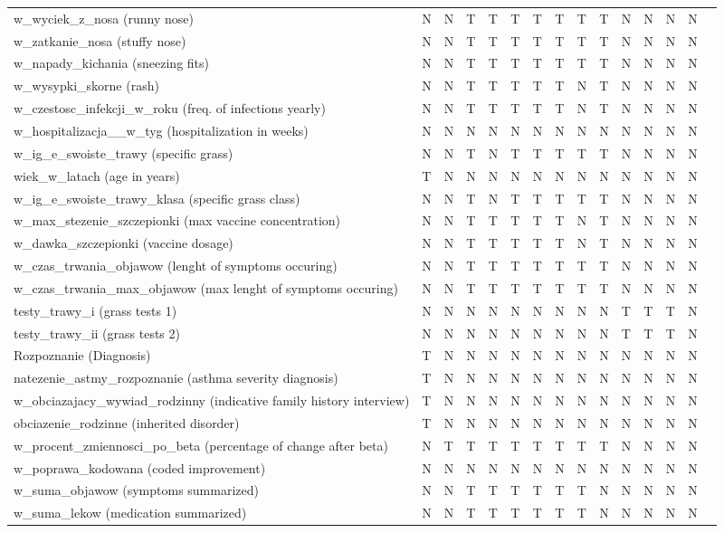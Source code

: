 \documentclass[10pt,oneside]{memoir}
\begin{document}
\begin{table}[htbp]
\begin{minipage}{\linewidth}
\begin{tabulary}{\linewidth}{@{}l@{}l@{}l@{}l@{}l@{}l@{}l@{}l@{}l@{}l@{}l@{}l@{}l@{}l@{}l@{}}
w\_wyciek\_z\_nosa (runny nose)&N&N&T&T&T&T&T&T&T&N&N&N&N \\
w\_zatkanie\_nosa (stuffy nose)&N&N&T&T&T&T&T&T&T&N&N&N&N \\
w\_napady\_kichania (sneezing fits)&N&N&T&T&T&T&T&T&T&N&N&N&N \\
w\_wysypki\_skorne (rash)&N&N&T&T&T&T&T&N&T&N&N&N&N \\
w\_czestosc\_infekcji\_w\_roku (freq. of infections yearly)&N&N&T&T&T&T&T&N&T&N&N&N&N \\
w\_hospitalizacja\_\_w\_tyg (hospitalization in weeks)&N&N&N&N&N&N&N&N&N&N&N&N&N \\
w\_ig\_e\_swoiste\_trawy (specific grass)&N&N&T&N&T&T&T&T&T&N&N&N&N \\
wiek\_w\_latach (age in years)&T&N&N&N&N&N&N&N&N&N&N&N&N \\
w\_ig\_e\_swoiste\_trawy\_klasa (specific grass class)&N&N&T&N&T&T&T&T&T&N&N&N&N \\
w\_max\_stezenie\_szczepionki (max vaccine concentration)&N&N&T&T&T&T&T&N&T&N&N&N&N \\
w\_dawka\_szczepionki (vaccine dosage)&N&N&T&T&T&T&T&N&T&N&N&N&N \\
w\_czas\_trwania\_objawow (lenght of symptoms occuring)&N&N&T&T&T&T&T&T&T&N&N&N&N \\
w\_czas\_trwania\_max\_objawow (max lenght of symptoms occuring)&N&N&T&T&T&T&T&T&T&N&N&N&N \\
testy\_trawy\_i (grass tests 1)&N&N&N&N&N&N&N&N&N&T&T&T&N \\
testy\_trawy\_ii (grass tests 2)&N&N&N&N&N&N&N&N&N&T&T&T&N \\
Rozpoznanie (Diagnosis)&T&N&N&N&N&N&N&N&N&N&N&N&N \\
natezenie\_astmy\_rozpoznanie (asthma severity diagnosis)&T&N&N&N&N&N&N&N&N&N&N&N&N \\
w\_obciazajacy\_wywiad\_rodzinny (indicative family history interview)&T&N&N&N&N&N&N&N&N&N&N&N&N \\
obciazenie\_rodzinne (inherited disorder)&T&N&N&N&N&N&N&N&N&N&N&N&N \\
w\_procent\_zmiennosci\_po\_beta (percentage of change after beta)&N&T&T&T&T&T&T&T&T&N&N&N&N \\
w\_poprawa\_kodowana (coded improvement)&N&N&N&N&N&N&N&N&N&N&N&N&N \\
w\_suma\_objawow (symptoms summarized)&N&N&T&T&T&T&T&T&N&N&N&N&N \\
w\_suma\_lekow (medication summarized)&N&N&T&T&T&T&T&T&N&N&N&N&N \\

\end{tabulary}
\end{minipage}
\end{table}
\end{document}

